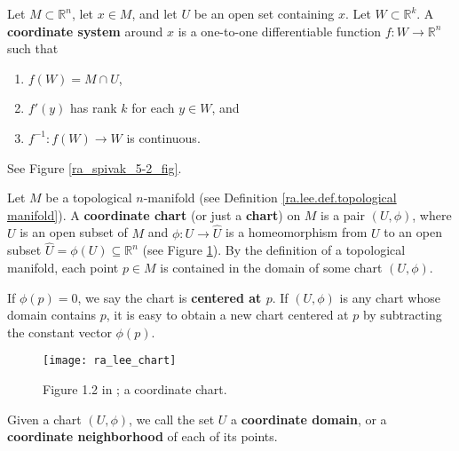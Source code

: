 \begin{definition}\label{ra.spivak.def.coordinate.chart}

Let \(M \subset \mathbb{R}^n\), let \(x \in M\), and let \(U\) be an open set containing \(x\). Let \(W \subset \mathbb{R}^k\). A \textbf{coordinate system} around \(x\) is a one-to-one differentiable function \(f: W \to \mathbb{R}^n\) such that 

\begin{enumerate}

\item \(f(W) = M \cap U\),

\item \(f'(y)\) has rank \(k\) for each \(y \in W\), and

\item \(f^{-1}: f(W) \to W\) is continuous.

\end{enumerate}

See Figure \ref{ra_spivak_5-2_fig}.

\end{definition}

\begin{definition}\label{ra.lee.def.coordinate.chart}

Let \(M\) be a topological \(n\)-manifold (see Definition \ref{ra.lee.def.topological manifold}). A \textbf{coordinate chart} (or just a \textbf{chart}) on \(M\) is a pair \((U, \phi)\), where \(U\) is an open subset of \(M\) and \(\phi: U \to \hat{U}\) is a homeomorphism from \(U\) to an open subset \(\hat{U} = \phi(U) \subseteq \mathbb{R}^n\) (see Figure \ref{ra_lee_chart_fig}). By the definition of a topological manifold, each point \(p \in M\) is contained in the domain of some chart \((U, \phi)\). 

If \(\phi(p)= 0\), we say the chart is \textbf{centered at \(p\)}. If \((U, \phi)\) is any chart whose domain contains \(p\), it is easy to obtain a new chart centered at \(p\) by subtracting the constant vector \(\phi(p)\).
%
\begin{figure}[htbp]
\begin{center}
\texttt{[image: ra\_lee\_chart]}
\caption{Figure 1.2 in \citet{lee2012introduction}; a coordinate chart.}
\label{ra_lee_chart_fig}
\end{center}
\end{figure}

Given a chart \((U, \phi)\), we call the set \(U\) a \textbf{coordinate domain}, or a \textbf{coordinate neighborhood} of each of its points.



\end{definition}

